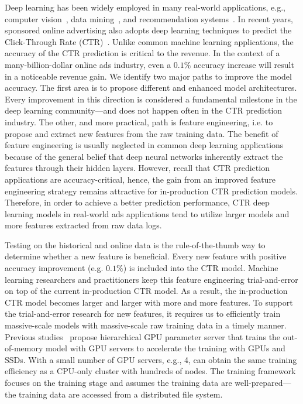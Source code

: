 \documentclass[sigconf]{acmart}
\begin{document}
Deep learning has been widely employed in many real-world applications, e.g., computer vision~\cite{Proc:GAN_NIPS14,Proc:Resnet_CVPR16,CV_review18,DBLP:conf/iclr/DosovitskiyB0WZ21}, data mining~\cite{nguyen2019machine,DBLP:conf/kdd/KangCQ020,DBLP:conf/icde/LiLYWLWLZ21,DBLP:conf/kdd/MerhejBMR21,DBLP:conf/kdd/ZerveasJPBE21}, and recommendation systems~\cite{Proc:Covington_2016,Article:Wei_2017,cheng2016wide,zhang2019deep,DBLP:conf/kdd/MaNLD20}.  In recent years, sponsored online advertising also adopts deep learning techniques to predict the Click-Through Rate (CTR)~\cite{DBLP:conf/sigir/LiuXGTZHL20,DBLP:conf/acl/QiWWH20,DBLP:conf/cikm/ZhuLLLHCZ20,DBLP:conf/cikm/ShengZZDDLYLZDZ21,DBLP:conf/sigir/ZhaoLZQHZL21,DBLP:conf/wsdm/ZhangQCLLZMC21}. Unlike common machine learning applications, the accuracy of the CTR prediction is critical to the revenue. 
In the context of a many-billion-dollar online ads industry, even a $0.1\%$ accuracy increase will result in a noticeable revenue gain. 
We identify two major paths to improve the model accuracy. The first area is to propose different and enhanced model architectures. Every improvement in this direction is considered a fundamental milestone in the deep learning community---and does not happen often in the CTR prediction industry.
The other, and more practical, path is feature engineering, i.e. to propose and extract new features from the raw training data. The benefit of feature engineering is usually neglected in common deep learning applications because of the general belief that deep neural networks inherently extract the features through their hidden layers. However, recall that CTR prediction applications are accuracy-critical, hence, the gain from an improved feature engineering strategy remains attractive for in-production CTR prediction models. 
Therefore, in order to achieve a better prediction performance, CTR deep learning models in real-world ads applications tend to utilize larger models and more features extracted from raw data logs. 

Testing on the historical and online data is the rule-of-the-thumb way to determine whether a new feature is beneficial. Every new feature with positive accuracy improvement (e.g. $0.1\%$) is included into the CTR model. Machine learning researchers and practitioners keep this feature engineering trial-and-error on top of the current in-production CTR model. As a result, the in-production CTR model becomes larger and larger with more and more features. To support the trial-and-error research for new features, it requires us to efficiently train massive-scale models with massive-scale raw training data in a timely manner. Previous studies~\cite{Proc:Zhao_MLSys20} propose hierarchical GPU parameter server that trains the out-of-memory model with GPU servers to accelerate the training with GPUs and SSDs. With a small number of GPU servers, e.g., 4, can obtain the same training efficiency as a CPU-only cluster with hundreds of nodes. The training framework focuses on the training stage and assumes the training data are well-prepared---the training data are accessed from a distributed file system.
\end{document}
